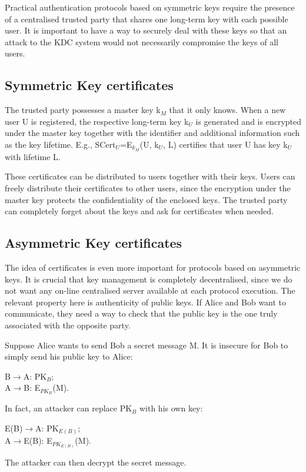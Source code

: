 \documentclass[a4paper, 12pt]{report}
\begin{document}
Practical authentication protocols based on symmetric keys require the presence of a centralised trusted party that shares one long-term key with each possible user. It is important to have a way to securely deal with these keys so that an attack to the KDC system would not necessarily compromise the keys of all users.

\subsection*{Symmetric Key certificates}
The trusted party possesses a master key k$_M$ that it only knows. When a new user U is registered, the respective long-term key k$_U$ is generated and is encrypted under the master key together with the identifier and additional information such as the key lifetime. E.g., SCert$_U$=E$_{k_M}$(U, k$_U$, L) certifies that user U has key k$_U$ with lifetime L.

These certificates can be distributed to users together with their keys. Users can freely distribute their certificates to other users, since the encryption under the master key protects the confidentiality of the enclosed keys. The trusted party can completely forget about the keys and ask for certificates when needed.

\subsection*{Asymmetric Key certificates}
The idea of certificates is even more important for protocols based on asymmetric keys. It is crucial that key management is completely decentralised, since we do not want any on-line centralised server available at each protocol execution. The relevant property here is authenticity of public keys. If Alice and Bob want to communicate, they need a way to check that the public key is the one truly associated with the opposite party.

Suppose Alice wants to send Bob a secret message M. It is insecure for Bob to simply send his public key to Alice:
\begin{center}
	B$\rightarrow$A: PK$_B$;\\
	A$\rightarrow$B: E$_{PK_B}$(M).
\end{center}
In fact, an attacker can replace PK$_B$ with his own key:
\begin{center}
	E(B)$\rightarrow$A: PK$_{E(B)}$;\\
	A$\rightarrow$E(B): E$_{PK_{E(B)}}$(M).
\end{center}
The attacker can then decrypt the secret message.
\end{document}
